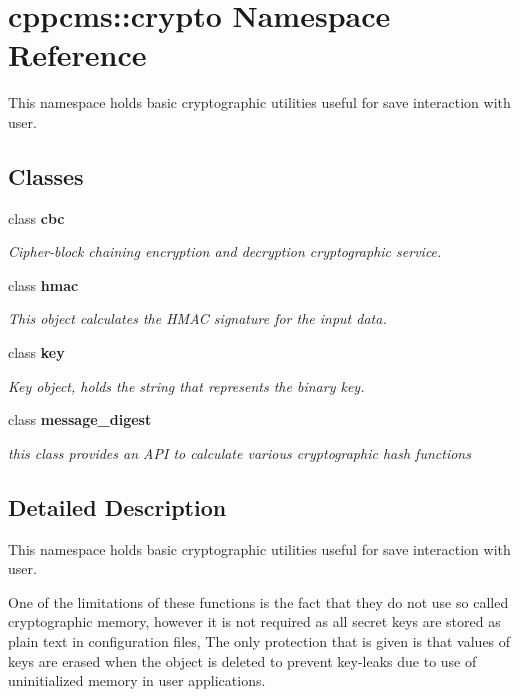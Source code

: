 \section{cppcms\+:\+:crypto Namespace Reference}
\label{namespacecppcms_1_1crypto}


This namespace holds basic cryptographic utilities useful for save interaction with user.  


\subsection*{Classes}
\begin{DoxyCompactItemize}
\item 
class {\bf cbc}
\begin{DoxyCompactList}\small\item\em Cipher-\/block chaining encryption and decryption cryptographic service. \end{DoxyCompactList}\item 
class {\bf hmac}
\begin{DoxyCompactList}\small\item\em This object calculates the H\+M\+AC signature for the input data. \end{DoxyCompactList}\item 
class {\bf key}
\begin{DoxyCompactList}\small\item\em Key object, holds the string that represents the binary key. \end{DoxyCompactList}\item 
class {\bf message\+\_\+digest}
\begin{DoxyCompactList}\small\item\em this class provides an A\+PI to calculate various cryptographic hash functions \end{DoxyCompactList}\end{DoxyCompactItemize}


\subsection{Detailed Description}
This namespace holds basic cryptographic utilities useful for save interaction with user. 

One of the limitations of these functions is the fact that they do not use so called cryptographic memory, however it is not required as all secret keys are stored as plain text in configuration files, The only protection that is given is that values of keys are erased when the object is deleted to prevent key-\/leaks due to use of uninitialized memory in user applications. 